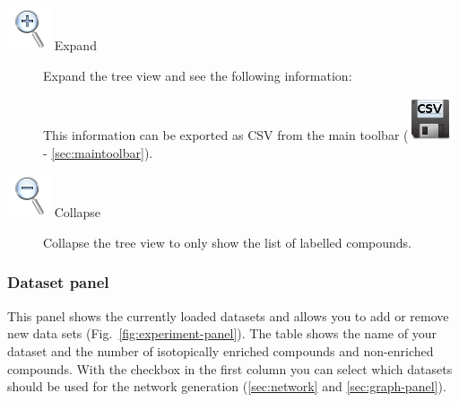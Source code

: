 \documentclass[a4paper,12pt]{scrartcl}
\begin{document}
\begin{description}

\item[\includegraphics{gfx/ico_zoom-in.png} Expand]
 Expand the tree view and see the following information:
\begin{center}
\end{center}
This information can be exported as CSV from the main toolbar (\includegraphics{../gui/icons/document-save-csv.png} - \ref{sec:maintoolbar}).

 \item[\includegraphics{gfx/ico_zoom-out.png} Collapse]
 Collapse the tree view to only show the list of labelled compounds. 
\end{description}

\subsubsection{Dataset panel}

\label{sec:dataset-panel}

This panel shows the currently loaded datasets and allows you to add or remove new data sets (Fig.~\ref{fig:experiment-panel}). The table shows the name of your dataset  and the number of isotopically enriched compounds and non-enriched compounds. With the checkbox in the first column you can select which datasets should be used for the network generation (\ref{sec:network} and \ref{sec:graph-panel}).
\end{document}
